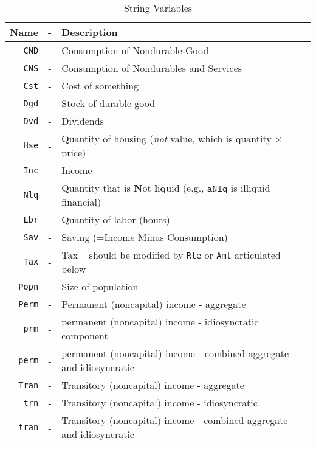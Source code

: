 \documentclass[12pt]{\econtex}
\begin{document}
\hypertarget{Standard-Variable-Names}{}
\begin{table}[ht]
  \centering
  \begin{tabular}{|rcl|}
    \hline
    Name & - & Description 
    \\ \hline
    \texttt{CND}    & - & Consumption of Nondurable Good 
    \\   \texttt{CNS}    & - & Consumption of Nondurables and Services
    \\  \texttt{Cst}    & - & Cost of something 
    \\  \texttt{Dgd}    & - & Stock of durable good
    \\  \texttt{Dvd}    & - & Dividends 
    \\  \texttt{Hse}    & - & Quantity of housing (\textit{not} value, which is quantity $\times$ price)
    \\  \texttt{Inc}    & - & Income
    \\  \texttt{Nlq}    & - & Quantity that is \textbf{N}ot \textbf{l}i\textbf{q}uid (e.g., $\mathtt{aNlq}$ is illiquid financial)
    \\  \texttt{Lbr}    & - & Quantity of labor (hours)
    \\  \texttt{Sav}    & - & Saving (=Income Minus Consumption)
    \\  \texttt{Tax}    & - & Tax -- should be modified by \texttt{Rte} or \texttt{Amt} articulated below
    \\  \texttt{Popn}    & - & Size of population
    \\  \texttt{Perm}   & - & Permanent (noncapital) income - aggregate
    \\  \texttt{prm}   & - & permanent (noncapital) income - idiosyncratic component
    \\  \texttt{perm}   & - & permanent (noncapital) income - combined aggregate and idiosyncratic
    \\  \texttt{Tran}   & - & Transitory (noncapital) income - aggregate
    \\  \texttt{trn}   & - & Transitory (noncapital) income - idiosyncratic
    \\  \texttt{tran}   & - & Transitory (noncapital) income - combined aggregate and idiosyncratic
    \\ \hline
  \end{tabular}
  \caption{String Variables}
  \label{table:Standard-Variable-Names}
\end{table}
\end{document}
